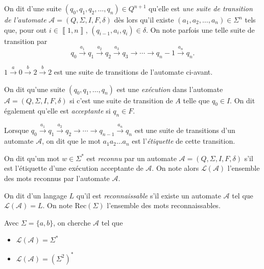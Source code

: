 \begin{defn}
	On dit d'une suite $(q_0, q_1, q_2, \ldots, q_n) \in Q^{n+1}$\/ qu'elle est {\it une suite de transition de l'automate}\/ $\mathcal{A} = (Q, \Sigma, I, F, \delta)$\/ dès lors qu'il existe $(a_1, a_2, \ldots, a_n) \in \Sigma^n$\/ tels que, pour out $i \in \left\llbracket 1,n \right\rrbracket$, $(q_{i-1}, a_i, q_i) \in \delta$. On note parfois une telle suite de transition par \[
		q_0 \xrightarrow{a_1} q_1 \xrightarrow{a_2} q_2 \xrightarrow{a_3} q_3 \to \cdots \to q_n-1\xrightarrow{a_n} q_n
	.\]
\end{defn}

\begin{exm}
	$1 \xrightarrow a 0 \xrightarrow b 2 \xrightarrow b 2$ est une suite de transitions de l'automate ci-avant.
\end{exm}

\begin{defn}
	On dit qu'une suite $(q_0, q_1, \ldots, q_n)$\/ est une {\it exécution}\/ dans l'automate $\mathcal{A} = (Q, \Sigma, I, F, \delta)$\/ si c'est une suite de transition de $A$\/ telle que $q_0 \in I$.
	On dit également qu'elle est {\it acceptante}\/ si $q_n \in F$.

	Lorsque $q_0 \xrightarrow{a_1} q_1 \xrightarrow{a_2} q_2 \to \cdots \to q_{n-1} \xrightarrow{a_n} q_n$\/ est une suite de transitions d'un automate $\mathcal{A}$, on dit que le mot $a_1a_2\ldots a_n$\/ est l'{\it étiquette}\/ de cette transition.
\end{defn}

\begin{defn}
	On dit qu'un mot $w \in \Sigma^*$\/ est {\it reconnu}\/ par un automate $\mathcal{A} = (Q, \Sigma, I, F, \delta)$\/ s'il est l'étiquette d'une exécution acceptante de $\mathcal{A}$.
	On note alors $\mathcal{L}(\mathcal{A})$\/ l'ensemble des mots reconnus par l'automate $\mathcal{A}$.
\end{defn}

\begin{defn}
	On dit d'un langage $L$\/ qu'il est {\it reconnaissable}\/ s'il existe un automate $\mathcal{A}$\/ tel que $\mathcal{L}(\mathcal{A}) = L$. On note $\mathrm{Rec}(\Sigma)$\/ l'ensemble des mots reconnaissables.
\end{defn}

\begin{exm}
	Avec $\Sigma = \{a,b\}$, on cherche $\mathcal{A}$\/ tel que
	\begin{itemize}
		\item$\mathcal{L}(\mathcal{A}) = \Sigma^*$
		\item $\mathcal{L}(\mathcal{A}) = (\Sigma^2)^*$\/
	\end{itemize}
\end{exm}

